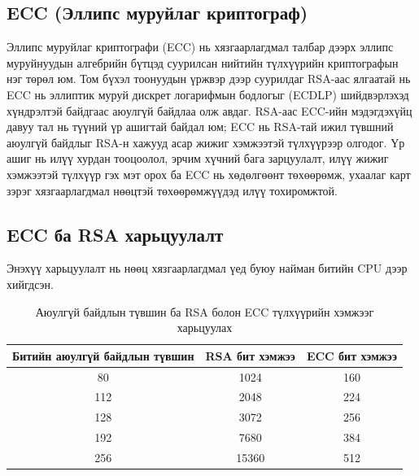 \subsection{ECC (Эллипс муруйлаг криптограф)}

Эллипс муруйлаг криптографи (ECC) нь хязгаарлагдмал талбар дээрх эллипс муруйнуудын алгебрийн бүтцэд суурилсан нийтийн түлхүүрийн криптографын нэг төрөл юм. Том бүхэл тоонуудын үржвэр дээр суурилдаг RSA-аас ялгаатай нь ECC нь эллиптик муруй дискрет логарифмын бодлогыг (ECDLP) шийдвэрлэхэд хүндрэлтэй байдгаас аюулгүй байдлаа олж авдаг. RSA-аас ECC-ийн мэдэгдэхүйц давуу тал нь түүний үр ашигтай байдал юм; ECC нь RSA-тай ижил түвшний аюулгүй байдлыг RSA-н хажууд асар жижиг хэмжээтэй түлхүүрээр олгодог. Үр ашиг нь илүү хурдан тооцоолол, эрчим хүчний бага зарцуулалт, илүү жижиг хэмжээтэй түлхүүр гэх мэт орох ба ECC нь хөдөлгөөнт төхөөрөмж, ухаалаг карт зэрэг хязгаарлагдмал нөөцтэй төхөөрөмжүүдэд илүү тохиромжтой.
\subsection{ECC ба RSA харьцуулалт}
Энэхүү харьцуулалт нь нөөц хязгаарлагдмал үед буюу найман битийн CPU дээр хийгдсэн.
\begin{table}[h]
	\centering
	\begin{tabular}{|c|c|c|}
		\hline
		\textbf{Битийн аюулгүй байдлын түвшин} & \textbf{RSA бит хэмжээ} & \textbf{ECC бит хэмжээ} \\ \hline
		80                                     & 1024                    & 160                     \\ \hline
		112                                    & 2048                    & 224                     \\ \hline
		128                                    & 3072                    & 256                     \\ \hline
		192                                    & 7680                    & 384                     \\ \hline
		256                                    & 15360                   & 512                     \\ \hline
	\end{tabular}
	\caption{Аюулгүй байдлын түвшин ба RSA болон ECC түлхүүрийн хэмжээг харьцуулах \cite{RSAvsECC}}
	\label{tab:rsa_ecc_key_sizes}
\end{table}

